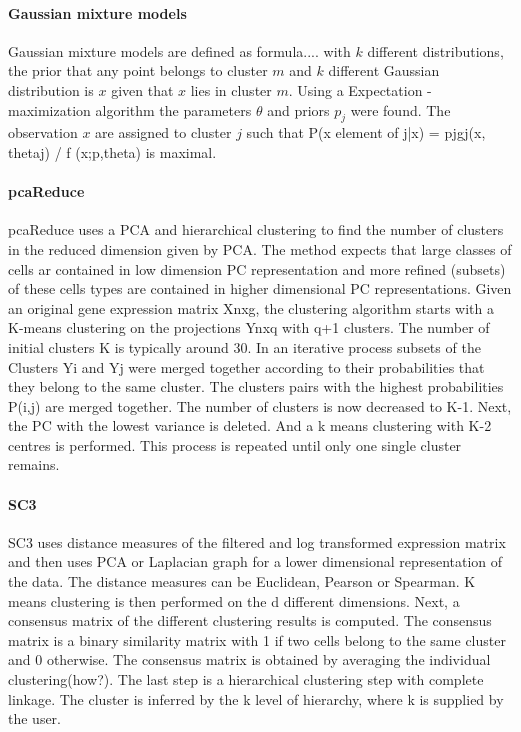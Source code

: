 \documentclass{article}\usepackage[]{graphicx}\usepackage[]{color}
\begin{document}
\paragraph{Gaussian mixture models}

Gaussian mixture models are defined as  formula....
with $k$ different distributions, the prior that any point belongs to cluster $m$ and $k$ different Gaussian distribution is $x$ given that $x$ lies in cluster $m$. Using a Expectation -maximization algorithm the parameters $\theta$ and priors $p_j$ 
were found. The observation $x$ are assigned to cluster $j$  such that P(x element of j|x) = pjgj(x, thetaj) / f (x;p,theta) is maximal.
\paragraph{pcaReduce}
pcaReduce uses a PCA and hierarchical clustering to find the number of clusters in the reduced dimension given by PCA. The method expects that large classes of cells ar contained in low dimension PC representation and more refined (subsets) of these cells types are contained in higher dimensional PC representations. Given an original gene expression matrix Xnxg, the clustering algorithm starts with a K-means clustering on the projections Ynxq with q+1 clusters. The number of initial clusters K is typically around 30. In an iterative process subsets of the Clusters Yi and Yj were merged together according to their probabilities that they belong to the same cluster.  The clusters pairs with the highest probabilities P(i,j) are merged together. The number of clusters is now decreased to K-1. Next, the PC with the lowest variance is deleted. And a k means clustering with K-2 centres is performed. This process is repeated until only one single cluster remains.

\paragraph{SC3}
SC3 uses distance measures of the filtered and log transformed expression matrix and then uses PCA or Laplacian graph for a lower dimensional representation of the data. The distance measures can be Euclidean, Pearson or Spearman. K means clustering is then performed on the d different dimensions. Next, a consensus matrix of the different clustering results is computed. The consensus matrix is a binary similarity matrix with 1 if two cells belong to the same cluster and 0 otherwise. The consensus matrix is obtained by averaging the individual clustering(how?). The last step is a hierarchical clustering step with complete linkage. The cluster is inferred by the k level of hierarchy, where k is supplied by the user.
\end{document}

